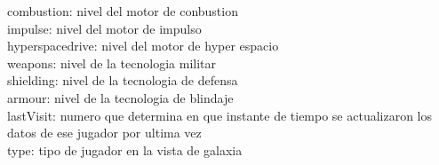 \documentclass{article}
\newcommand\tab[1][1cm]{\hspace*{#1}}
\begin{document}
            \tab\tab combustion: nivel del motor de conbustion\\
            \tab\tab impulse: nivel del motor de impulso\\
            \tab\tab hyperspacedrive: nivel del motor de hyper espacio\\
            \tab\tab weapons: nivel de la tecnologia militar\\
            \tab\tab shielding: nivel de la tecnologia de defensa\\
            \tab\tab armour: nivel de la tecnologia de blindaje\\
            \tab lastVisit: numero que determina en que instante de tiempo se actualizaron los datos de ese jugador por ultima vez\\
            \tab type: tipo de jugador en la vista de galaxia\\
\end{document}
